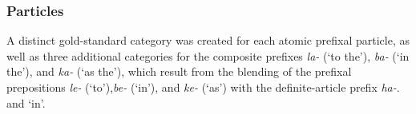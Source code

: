 	

\subsubsection{Particles}
A distinct gold-standard category was created for each atomic prefixal particle, as well as three additional categories for the composite
prefixes \textit{la-} (`to the'), \textit{ba-} (`in the'), and \textit{ka-} (`as the'), which result from the blending of the prefixal prepositions \textit{le-} (`to'),\textit{be-} (`in'), and \textit{ke-} (`as') with the definite-article prefix \textit{ha-}.
and  `in'. 

